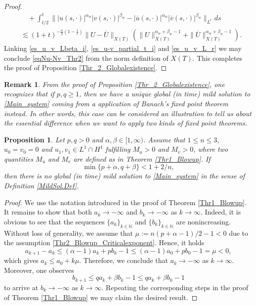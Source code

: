 \documentclass[11pt,reqno]{amsart}
\newtheorem{proposition}{Proposition}[section]
\newtheorem{remark}{Remark}[section]
\newcommand{\tron}[1]{\left(#1\right)}
\begin{document}
\begin{proof}
\begin{align}
			&\quad+\int_{t/2}^t\||u(s,\cdot)|^{\alpha_w}|v(s,\cdot)|^{\beta_w}-|\overline u(s,\cdot)|^{\alpha_w}|\overline v(s,\cdot)|^{\beta_w}\|_{L^{r}}ds\nonumber\\
			&\lesssim (1+t)^{-\frac{n}{2}\tron{1-\frac{1}{r}}}\|U-\overline{U}\|_{X(T)}\tron{\|U\|^{\alpha_w+\beta_w-1}_{X(T)}+\|\overline{U}\|^{\alpha_w+\beta_w-1}_{X(T)}}. \label{es_u_v_L_r}
		\end{align}
		Linking \eqref{es_u_v_Lbeta_i}, \eqref{es_u-v_partial_t_i} and \eqref{es_u_v_L_r} we may conclude \eqref{eqNu-Nv_Thr2} from the norm definition of $X(T)$. This completes the proof of Proposition \ref{Thr_2_Globalexistence}.
	\end{proof}
	
	\begin{remark}
		{\rm
			From the proof of Proposition \ref{Thr_2_Globalexistence}, one recognizes that if $p,q\geq 1$, then we have a unique global (in time) mild solution to \eqref{Main_system} coming from a application of Banach's fixed point theorem instead. In other words, this case can be considered an illustration to tell us about the essential difference when we want to apply two kinds of fixed point theorems.
		}
	\end{remark}
	
	\begin{proposition}\label{Thr2_Blowup}
		Let $p,q>0$ and $\alpha,\beta\in[1,\infty)$. Assume that $1\leq n\leq 3$, $u_0=v_0=0$ and $u_1,v_1\in L^1\cap H^1$ fulfilling $M_u>0$ and $M_v>0$, where two quantities $M_u$ and $M_v$ are defined as in Theorem \ref{Thr1_Blowup}. If
		\begin{equation}\label{Thr2_Blowup_Criticalexponent}
			\min\{p+\alpha,q+\beta\}<1+2/n,
		\end{equation}
		then there is no global (in time) mild solution to \eqref{Main_system} in the sense of Definition \ref{MildSol.Def}.
	\end{proposition}
	
	\begin{proof}
		We use the notation introduced in the proof of Theorem \ref{Thr1_Blowup}.
		It remains to show that both $a_k\to-\infty$ and $b_k\to-\infty$ as $k\to\infty$. Indeed, it is obvious to see that the sequences $\{a_k\}_{k\in \mathbb N}$ and $\{b_k\}_{k\in \mathbb N}$ are nonincreasing. Without loss of generality, we assume that $\mu:=n(p+\alpha-1)/2-1<0$ due to the assumption \eqref{Thr2_Blowup_Criticalexponent}. Hence, it holds
		\[
		a_{k+1}-a_k\leq (\alpha-1)a_k+pb_k-1\leq(\alpha-1)a_0+pb_0-1=\mu<0,
		\]
		which gives $a_{k}\leq a_0+k\mu$. Therefore, we conclude that $a_k\to -\infty$ as $k\to\infty$. Moreover, one observes
		$$ b_{k+1}\leq qa_k+\beta b_k-1\leq qa_k+\beta b_0-1 $$
		to arrive at $b_k\to -\infty$ as $k\to\infty$. Repeating the corresponding steps in the proof of Theorem \ref{Thr1_Blowup} we may claim the desired result.
	\end{proof}
	
\end{document}
